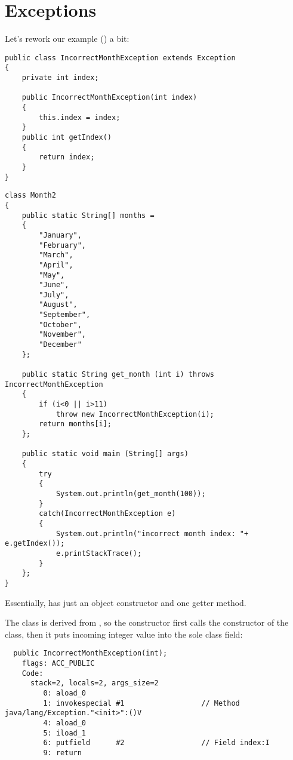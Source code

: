 \section{Exceptions}

Let's rework our  example () a bit:

\begin{lstlisting}[caption=IncorrectMonthException.java]
public class IncorrectMonthException extends Exception
{
	private int index;

	public IncorrectMonthException(int index)
	{
		this.index = index;
	} 
	public int getIndex()
	{
		return index;
	}
}
\end{lstlisting}

\begin{lstlisting}[caption=Month2.java]
class Month2
{
	public static String[] months = 
	{
		"January", 
		"February", 
		"March", 
		"April",
		"May",
		"June",
		"July",
		"August",
		"September",
		"October",
		"November",
		"December"
	};

	public static String get_month (int i) throws IncorrectMonthException
	{
		if (i<0 || i>11)
			throw new IncorrectMonthException(i);
		return months[i];
	};

	public static void main (String[] args)
	{
		try
		{
			System.out.println(get_month(100));
		}
		catch(IncorrectMonthException e)
		{
			System.out.println("incorrect month index: "+ e.getIndex());
			e.printStackTrace();
		}
	};
}
\end{lstlisting}

Essentially,  has just an object constructor 
and one getter method.

The  class is derived from , 
so the  constructor
first calls the constructor of the  class, 
then it puts incoming integer value into the sole  class field:

\begin{lstlisting}
  public IncorrectMonthException(int);
    flags: ACC_PUBLIC
    Code:
      stack=2, locals=2, args_size=2
         0: aload_0       
         1: invokespecial #1                  // Method java/lang/Exception."<init>":()V
         4: aload_0       
         5: iload_1       
         6: putfield      #2                  // Field index:I
         9: return        
\end{lstlisting}

